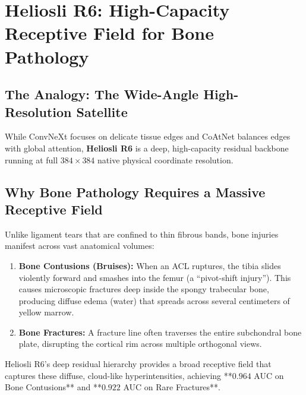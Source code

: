 \documentclass[11pt,a4paper]{article}
\begin{document}
\newpage

\section{Heliosli R6: High-Capacity Receptive Field for Bone Pathology}

\subsection{The Analogy: The Wide-Angle High-Resolution Satellite}
While ConvNeXt focuses on delicate tissue edges and CoAtNet balances edges with global attention, \textbf{Heliosli R6} is a deep, high-capacity residual backbone running at full $384\times 384$ native physical coordinate resolution.

\subsection{Why Bone Pathology Requires a Massive Receptive Field}
Unlike ligament tears that are confined to thin fibrous bands, bone injuries manifest across vast anatomical volumes:
\begin{enumerate}[leftmargin=*]
    \item \textbf{Bone Contusions (Bruises):} When an ACL ruptures, the tibia slides violently forward and smashes into the femur (a ``pivot-shift injury''). This causes microscopic fractures deep inside the spongy trabecular bone, producing diffuse edema (water) that spreads across several centimeters of yellow marrow.
    \item \textbf{Bone Fractures:} A fracture line often traverses the entire subchondral bone plate, disrupting the cortical rim across multiple orthogonal views.
\end{enumerate}

Heliosli R6's deep residual hierarchy provides a broad receptive field that captures these diffuse, cloud-like hyperintensities, achieving **$0.964$ AUC on Bone Contusions** and **$0.922$ AUC on Rare Fractures**.

\vspace{0.1in}

\end{document}
